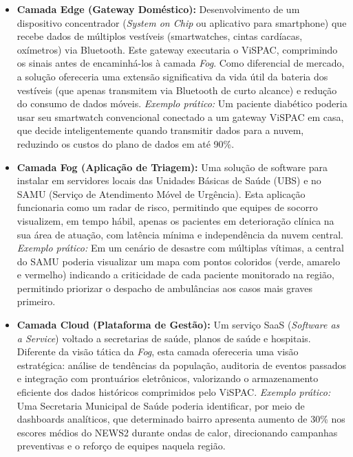 \documentclass[twoside,english,brazilian]{UNISINOSmonografia}
\begin{document}
\begin{itemize}
    \item \textbf{Camada Edge (Gateway Doméstico):} Desenvolvimento de um dispositivo concentrador (\textit{System on Chip} ou aplicativo para smartphone) que recebe dados de múltiplos vestíveis (smartwatches, cintas cardíacas, oxímetros) via Bluetooth. Este gateway executaria o ViSPAC, comprimindo os sinais antes de encaminhá-los à camada \textit{Fog}. Como diferencial de mercado, a solução ofereceria uma extensão significativa da vida útil da bateria dos vestíveis (que apenas transmitem via Bluetooth de curto alcance) e redução do consumo de dados móveis. \textit{Exemplo prático:} Um paciente diabético poderia usar seu smartwatch convencional conectado a um gateway ViSPAC em casa, que decide inteligentemente quando transmitir dados para a nuvem, reduzindo os custos do plano de dados em até 90\%.
    
    \item \textbf{Camada Fog (Aplicação de Triagem):} Uma solução de software para instalar em servidores locais das Unidades Básicas de Saúde (UBS) e no SAMU (Serviço de Atendimento Móvel de Urgência). Esta aplicação funcionaria como um radar de risco, permitindo que equipes de socorro visualizem, em tempo hábil, apenas os pacientes em deterioração clínica na sua área de atuação, com latência mínima e independência da nuvem central. \textit{Exemplo prático:} Em um cenário de desastre com múltiplas vítimas, a central do SAMU poderia visualizar um mapa com pontos coloridos (verde, amarelo e vermelho) indicando a criticidade de cada paciente monitorado na região, permitindo priorizar o despacho de ambulâncias aos casos mais graves primeiro.
    
    \item \textbf{Camada Cloud (Plataforma de Gestão):} Um serviço SaaS (\textit{Software as a Service}) voltado a secretarias de saúde, planos de saúde e hospitais. Diferente da visão tática da \textit{Fog}, esta camada ofereceria uma visão estratégica: análise de tendências da população, auditoria de eventos passados e integração com prontuários eletrônicos, valorizando o armazenamento eficiente dos dados históricos comprimidos pelo ViSPAC. \textit{Exemplo prático:} Uma Secretaria Municipal de Saúde poderia identificar, por meio de dashboards analíticos, que determinado bairro apresenta aumento de 30\% nos escores médios do NEWS2 durante ondas de calor, direcionando campanhas preventivas e o reforço de equipes naquela região.
\end{itemize}
\end{document}
